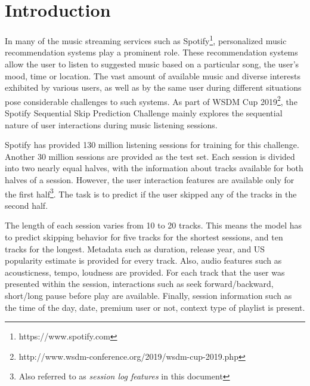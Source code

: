 \documentclass[sigconf]{acmart}
\begin{document}


%

%
\maketitle

\section{Introduction}
In many of the music streaming services such as Spotify\footnote{https://www.spotify.com}, personalized music recommendation systems play a prominent role. These recommendation systems allow the user to listen to suggested music based on a particular song, the user's mood, time or location. The vast amount of available music and diverse interests exhibited by various users, as well as by the same user during different situations pose considerable challenges to such systems. As part of WSDM Cup 2019\footnote{http://www.wsdm-conference.org/2019/wsdm-cup-2019.php}, the Spotify Sequential Skip Prediction Challenge mainly explores the sequential nature of user interactions during music listening sessions.

Spotify has provided 130 million listening sessions for training for this challenge. Another 30 million sessions are provided as the test set\cite{brost2019music}. Each session is divided into two nearly equal halves, with the information about tracks available for both halves of a session. However, the user interaction features are available only for the first half\footnote{Also referred to as \textit{session log features} in this document}. The task is to predict if the user skipped any of the tracks in the second half.

The length of each session varies from 10 to 20 tracks. This means the model has to predict skipping behavior for five tracks for the shortest sessions, and ten tracks for the longest. Metadata such as duration, release year, and US popularity estimate is provided for every track. Also, audio features such as acousticness, tempo, loudness are provided. For each track that the user was presented within the session, interactions such as seek forward/backward, short/long pause before play are available. Finally, session information such as the time of the day, date, premium user or not, context type of playlist is present.
\end{document}
